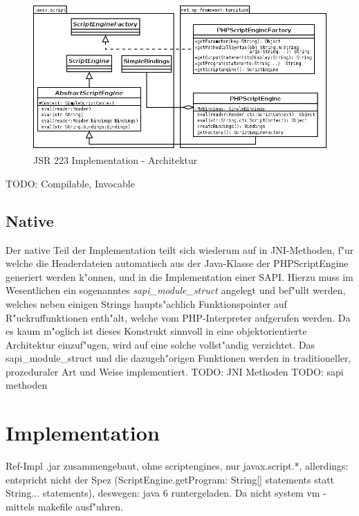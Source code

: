 \begin{figure}[h]
\includegraphics[width=\textwidth]{chap1/img/turpitude.png}
\caption{JSR 223 Implementation - Architektur}
\label{fig:jsr223impl}
\end{figure}

TODO: Compilable, Invocable

\subsection{Native}
\label{sec:chap1:design:native}

Der native Teil der Implementation teilt sich wiederum auf in JNI-Methoden, f"ur welche die Headerdateien automatisch aus
der Java-Klasse der PHPScriptEngine generiert werden k"onnen, und in die Implementation einer SAPI. Hierzu muss im
Wesentlichen ein sogenanntes \emph{sapi\_module\_struct} angelegt und bef"ullt werden, welches neben einigen Strings
haupts"achlich Funktionspointer auf R"uckruffunktionen enth"alt, welche vom PHP-Interpreter aufgerufen werden. Da es
kaum m"oglich ist dieses Konstrukt sinnvoll in eine objektorientierte Architektur einzuf"ugen, wird auf eine solche
vollst"andig verzichtet. Das sapi\_module\_struct und die dazugeh"origen Funktionen werden in traditioneller,
prozeduraler Art und Weise implementiert.
TODO: JNI Methoden
TODO: sapi methoden


\section{Implementation}
\label{sec:chap1:impl}

Ref-Impl .jar zusammengebaut, ohne scriptengines, nur javax.script.*, allerdings: entspricht nicht der Spez 
(ScriptEngine.getProgram: String[] statements statt String... statements), deswegen: java 6 runtergeladen.
Da nicht system vm - mittels makefile ausf"uhren.

